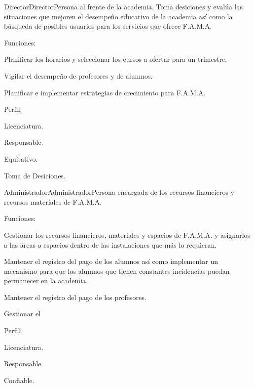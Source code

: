 
\begin{actor}{Director}{Director}{Persona al frente de la academia. Toma desiciones y evalúa las situaciones que mejoren el desempeño educativo de la academia así como la búsqueda de posibles usuarios para los servicios que ofrece F.A.M.A.}
\item[Funciones:]\cdtEmpty
	\begin{Citemize}
		\item Planificar los horarios y seleccionar los cursos a ofertar para un trimestre.
		\item Vigilar el desempeño de profesores y de alumnos.
		\item Planificar e implementar estrategias de crecimiento para F.A.M.A.	
	\end{Citemize}
	
\item[Perfil:]\cdtEmpty
	\begin{Citemize}
		\item Licenciatura.
		\item Responsable.
		\item Equitativo.
		\item Toma de Desiciones. 
	\end{Citemize}

\end{actor}

\begin{actor}{Administrador}{Administrador}{Persona encargada de los recursos financieros y recursos materiales de F.A.M.A. }
\item[Funciones:]\cdtEmpty
	\begin{Citemize}
		\item Gestionar los recursos financieros, materiales y espacios de F.A.M.A. y asignarlos a las áreas o espacios dentro de las instalaciones que 
		más lo requieran.
		\item Mantener el registro del pago de los alumnos así como implementar un mecanismo para que los alumnos que tienen constantes incidencias puedan permanecer en la academia. 
		\item Mantener el registro del pago de los profesores.
		\item Gestionar el 
	\end{Citemize}
\item[Perfil:]\cdtEmpty
	\begin{Citemize}
		\item Licenciatura.
		\item Responsable.
		\item Confiable.
	\end{Citemize}
\end{actor}


